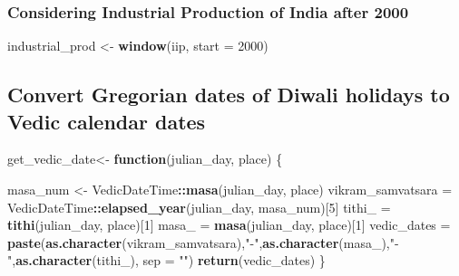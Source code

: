 \documentclass[
]{article}
\newenvironment{Shaded}{\begin{snugshade}}{\end{snugshade}}
\newcommand{\AttributeTok}[1]{\textcolor[rgb]{0.13,0.29,0.53}{#1}}
\newcommand{\ControlFlowTok}[1]{\textcolor[rgb]{0.13,0.29,0.53}{\textbf{#1}}}
\newcommand{\DecValTok}[1]{\textcolor[rgb]{0.00,0.00,0.81}{#1}}
\newcommand{\FunctionTok}[1]{\textcolor[rgb]{0.13,0.29,0.53}{\textbf{#1}}}
\newcommand{\NormalTok}[1]{#1}
\newcommand{\OtherTok}[1]{\textcolor[rgb]{0.56,0.35,0.01}{#1}}
\newcommand{\SpecialCharTok}[1]{\textcolor[rgb]{0.81,0.36,0.00}{\textbf{#1}}}
\newcommand{\StringTok}[1]{\textcolor[rgb]{0.31,0.60,0.02}{#1}}
\begin{document}
\hypertarget{considering-industrial-production-of-india-after-2000}{%
\subsubsection{Considering Industrial Production of India after
2000}\label{considering-industrial-production-of-india-after-2000}}

\begin{Shaded}
\begin{Highlighting}[]
\NormalTok{industrial\_prod }\OtherTok{\textless{}{-}} \FunctionTok{window}\NormalTok{(iip, }\AttributeTok{start =} \DecValTok{2000}\NormalTok{)}
\end{Highlighting}
\end{Shaded}

\hypertarget{convert-gregorian-dates-of-diwali-holidays-to-vedic-calendar-dates}{%
\subsection{Convert Gregorian dates of Diwali holidays to Vedic calendar
dates}\label{convert-gregorian-dates-of-diwali-holidays-to-vedic-calendar-dates}}

\begin{Shaded}
\begin{Highlighting}[]
\NormalTok{get\_vedic\_date}\OtherTok{\textless{}{-}} \ControlFlowTok{function}\NormalTok{(julian\_day, place) \{}
  
\NormalTok{masa\_num }\OtherTok{\textless{}{-}}\NormalTok{ VedicDateTime}\SpecialCharTok{::}\FunctionTok{masa}\NormalTok{(julian\_day, place)}
\NormalTok{vikram\_samvatsara }\OtherTok{=}\NormalTok{ VedicDateTime}\SpecialCharTok{::}\FunctionTok{elapsed\_year}\NormalTok{(julian\_day, masa\_num)[}\DecValTok{5}\NormalTok{]}
\NormalTok{tithi\_ }\OtherTok{=} \FunctionTok{tithi}\NormalTok{(julian\_day, place)[}\DecValTok{1}\NormalTok{]}
\NormalTok{masa\_ }\OtherTok{=} \FunctionTok{masa}\NormalTok{(julian\_day, place)[}\DecValTok{1}\NormalTok{]}
\NormalTok{vedic\_dates }\OtherTok{=} \FunctionTok{paste}\NormalTok{(}\FunctionTok{as.character}\NormalTok{(vikram\_samvatsara),}\StringTok{"{-}"}\NormalTok{,}\FunctionTok{as.character}\NormalTok{(masa\_),}\StringTok{"{-}"}\NormalTok{,}\FunctionTok{as.character}\NormalTok{(tithi\_), }\AttributeTok{sep =} \StringTok{""}\NormalTok{) }
\FunctionTok{return}\NormalTok{(vedic\_dates)}
\NormalTok{\}}
\end{Highlighting}
\end{Shaded}
\end{document}
